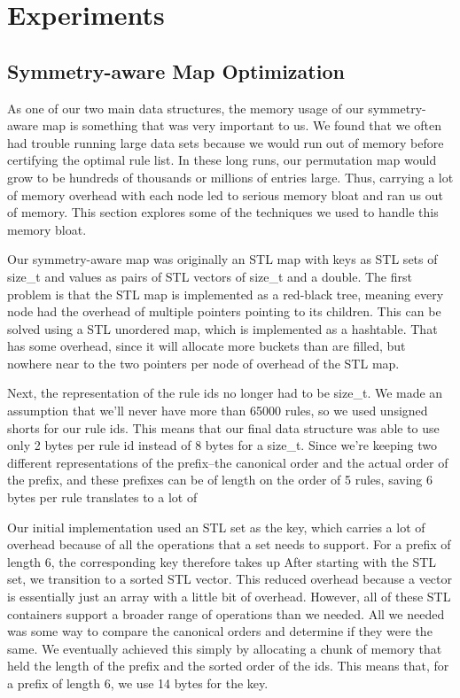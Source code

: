 \chapter{Experiments}

\section{Symmetry-aware Map Optimization}
As one of our two main data structures, the memory usage of our symmetry-aware map is something that was very important to us.
We found that we often had trouble running large data sets because we would run out of memory before certifying the optimal rule list.
In these long runs, our permutation map would grow to be hundreds of thousands or millions of entries large.
Thus, carrying a lot of memory overhead with each node led to serious memory bloat and ran us out of memory.
This section explores some of the techniques we used to handle this memory bloat.

Our symmetry-aware map was originally an STL map with keys as STL sets of size\_t and values as pairs of STL vectors of size\_t and a double.
The first problem is that the STL map is implemented as a red-black tree, meaning every node had the overhead of multiple pointers pointing to its children.
This can be solved using a STL unordered map, which is implemented as a hashtable.
That has some overhead, since it will allocate more buckets than are filled, but nowhere near to the two pointers per node of overhead of the STL map.

Next, the representation of the rule ids no longer had to be size\_t.
We made an assumption that we'll never have more than 65000 rules, so we used unsigned shorts for our rule ids.
This means that our final data structure was able to use only 2 bytes per rule id instead of 8 bytes for a size\_t.
Since we're keeping two different representations of the prefix--the canonical order and the actual order of the prefix, and these prefixes can be of length on the order of 5 rules, saving 6 bytes per rule translates to a lot of 

Our initial implementation used an STL set as the key, which carries a lot of overhead because of all the operations that a set needs to support.
For a prefix of length 6, the corresponding key therefore takes up 
After starting with the STL set, we transition to a sorted STL vector.
This reduced overhead because a vector is essentially just an array with a little bit of overhead.
However, all of these STL containers support a broader range of operations than we needed.
All we needed was some way to compare the canonical orders and determine if they were the same.
We eventually achieved this simply by allocating a chunk of memory that held the length of the prefix and the sorted order of the ids.
This means that, for a prefix of length 6, we use 14 bytes for the key.

